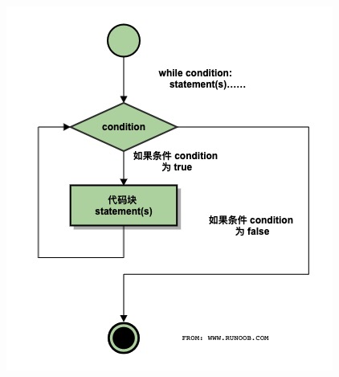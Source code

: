 \documentclass[11pt]{beamer}
\begin{document}
\begin{frame}[fragile]
\begin{minipage}[t]{0.4\linewidth}
\begin{figure}
	\centering
	\includegraphics[height=0.35\textheight]{figures/whileloop}
	\label{fig:whileloop}
\end{figure}
	\end{minipage}
\end{frame}
\end{document}
